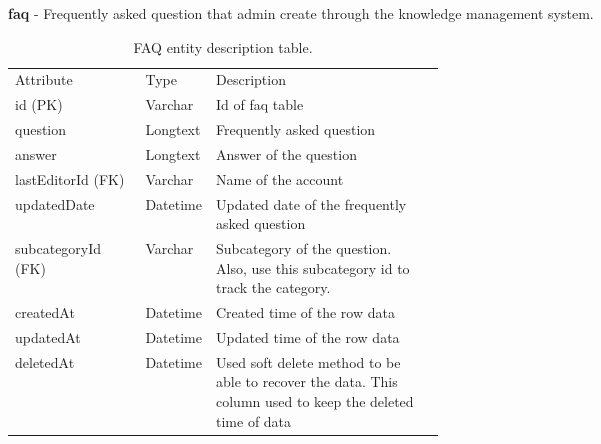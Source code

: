 \documentclass[12pt,oneside,openright,a4paper]{cpe-english-project}
\begin{document}
\pagebreak
\textbf{faq} - Frequently asked question that admin create through the knowledge management system.
\begin{table}[ht]
	\caption{FAQ entity description table.}
	\label{tab:FAQ entity description table.}
\begin{adjustbox}{width=\textwidth}
\begin{tabular}{llp{0.5\linewidth}l}
\rowcolor[HTML]{5B9BD5} 
Attribute          & Type     & Description                                                                                                   \\
\rowcolor[HTML]{DEEAF6} 
id (PK)            & Varchar  & Id of faq table                                                                                               \\
question           & Longtext  & Frequently asked   question                                                                                   \\
\rowcolor[HTML]{DEEAF6} 
answer             & Longtext  & Answer of the question                                                                                        \\
lastEditorId (FK)  & Varchar  & Name of the account                                                                                        \\
\rowcolor[HTML]{DEEAF6} 
updatedDate		   & Datetime & Updated date of the frequently asked question 																\\
subcategoryId (FK) & Varchar  & Subcategory of the question. Also, use this subcategory id to track   the category.                           \\
\rowcolor[HTML]{DEEAF6} 
createdAt          & Datetime & Created time of the row   data                                                                                \\
updatedAt          & Datetime & Updated time of the row data                                                                                  \\
\rowcolor[HTML]{DEEAF6} 
deletedAt          & Datetime & Used soft delete method   to be able to recover the data. This column used to keep the deleted time of data
\end{tabular}
\end{adjustbox}
\end{table}
\end{document}
